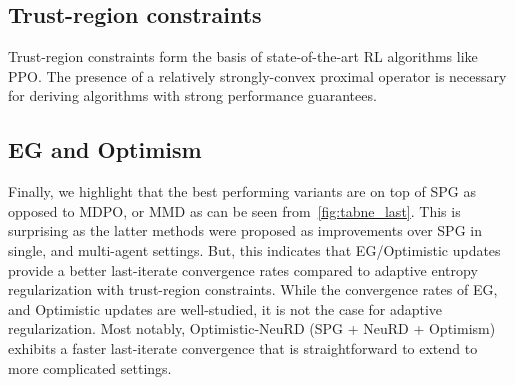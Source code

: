 \subsection{Trust-region constraints}
Trust-region constraints form the basis of state-of-the-art RL algorithms like PPO.
The presence of a relatively strongly-convex proximal operator is necessary for deriving algorithms
with strong performance guarantees.

\subsection{EG and Optimism}
Finally, we highlight that the best performing variants are on top of SPG as opposed to MDPO, or
MMD as can be seen from~\ref{fig:tabne_last}.
This is surprising as the latter methods were proposed as improvements over SPG in single, and
multi-agent settings.
But, this indicates that EG/Optimistic updates provide a better last-iterate convergence rates
compared to adaptive entropy regularization with trust-region constraints.
While the convergence rates of EG, and Optimistic updates are well-studied, it is not the case for
adaptive regularization.
Most notably, Optimistic-NeuRD (SPG + NeuRD + Optimism) exhibits a faster last-iterate convergence
that is straightforward to extend to more complicated settings.
